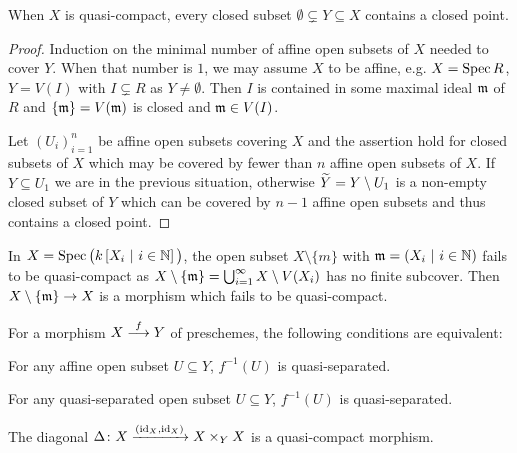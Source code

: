 \documentclass[a4paper,parskip=half,numbers=enddot, DIV=12]{scrreprt}
\begin{document}
\begin{prop}
    When $X$ is quasi-compact, every closed subset $\emptyset\subsetneq Y\subseteq X$ contains a closed point.
\end{prop}
\begin{proof}
    Induction on the minimal number of affine open subsets of $X$ needed to cover $Y$. When that number is $1$, we may assume $X$ to be affine, e.g. $X= \operatorname{Spec} R$, $Y=V(I)$ with $I\subsetneq R$ as $Y\neq\emptyset$. Then $I$ is contained in some maximal ideal $\mathfrak{m}$ of $R$ and $\{\mathfrak{m}\} = V(\mathfrak{m})$ is closed and $\mathfrak{m}\in V(I)$.
    
    Let $(U_i)_{i=1}^n$ be affine open subsets covering $X$ and the assertion hold for closed subsets of $X$ which may be covered by fewer than $n$ affine open subsets of $X$. If $Y\subseteq U_1$ we are in the previous situation, otherwise $\snake Y = Y\setminus U_1$ is a non-empty closed subset of $Y$ which can be covered by $n-1$ affine open subsets and thus contains a closed point.
\end{proof}
\begin{example}
    In $X=\operatorname{Spec} \big(k\left[X_i \ \middle|\  i\in \mathbb{N}\right]\big)$, the open subset $X\setminus \{m\}$ with $\mathfrak{m}= \left( X_i\ \middle|\  i\in\mathbb{N} \right)$ fails to be quasi-compact as $X\setminus \{\mathfrak{m}\} = \bigcup_{i=1}^\infty X\setminus V(X_i)$ has no finite subcover. Then $X\setminus \{\mm\}\morphism X$ is a morphism which fails to be quasi-compact.
\end{example}
\begin{lem}
    For a morphism $X\morphism[f] Y$ of preschemes, the following conditions are equivalent:
    \begin{alphanumerate}
    \item 
        For any affine open subset $U\subseteq Y$, $f^{-1}(U)$ is quasi-separated.
    \item 
        For any quasi-separated open subset $U\subseteq Y$, $f^{-1}(U)$ is quasi-separated.
    \item 
        The diagonal $\Delta\colon X \xrightarrow{(\operatorname{id}_X,\operatorname{id}_X)} X\times_Y X$ is a quasi-compact morphism.
    \end{alphanumerate}
\end{lem}
\end{document}
